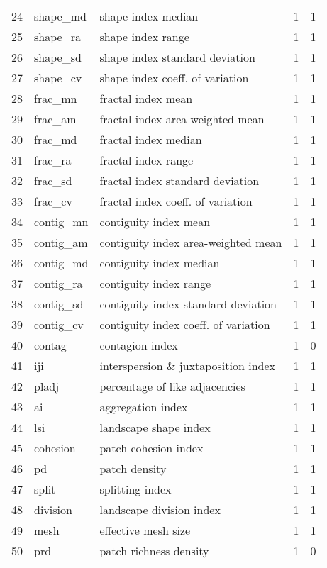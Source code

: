 \begin{longtable}{rllrr}
   24 & shape\_md & shape index median &   1 &   1 \\ 
   25 & shape\_ra & shape index range &   1 &   1 \\ 
   26 & shape\_sd & shape index standard deviation &   1 &   1 \\ 
   27 & shape\_cv & shape index coeff. of variation &   1 &   1 \\ 
   28 & frac\_mn & fractal index mean &   1 &   1 \\ 
   29 & frac\_am & fractal index area-weighted mean &   1 &   1 \\ 
   30 & frac\_md & fractal index median &   1 &   1 \\ 
   31 & frac\_ra & fractal index range &   1 &   1 \\ 
   32 & frac\_sd & fractal index standard deviation &   1 &   1 \\ 
   33 & frac\_cv & fractal index coeff. of variation &   1 &   1 \\ 
   34 & contig\_mn & contiguity index mean &   1 &   1 \\ 
   35 & contig\_am & contiguity index area-weighted mean &   1 &   1 \\ 
   36 & contig\_md & contiguity index median &   1 &   1 \\ 
   37 & contig\_ra & contiguity index range &   1 &   1 \\ 
   38 & contig\_sd & contiguity index standard deviation &   1 &   1 \\ 
   39 & contig\_cv & contiguity index coeff. of variation &   1 &   1 \\ 
   40 & contag & contagion index &   1 &   0 \\ 
   41 & iji & interspersion \& juxtaposition index &   1 &   1 \\ 
   42 & pladj & percentage of like adjacencies &   1 &   1 \\ 
   43 & ai & aggregation index &   1 &   1 \\ 
   44 & lsi & landscape shape index &   1 &   1 \\ 
   45 & cohesion & patch cohesion index &   1 &   1 \\ 
   46 & pd & patch density &   1 &   1 \\ 
   47 & split & splitting index &   1 &   1 \\ 
   48 & division & landscape division index &   1 &   1 \\ 
   49 & mesh & effective mesh size &   1 &   1 \\ 
   50 & prd & patch richness density &   1 &   0 \\ 

\end{longtable}
